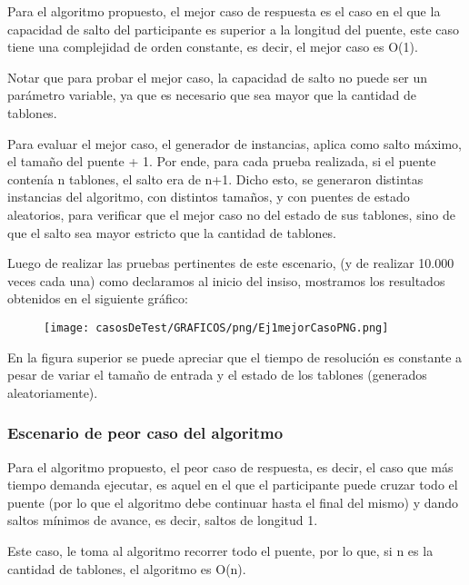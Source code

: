 \noindent Para el algoritmo propuesto, el mejor caso de respuesta es el caso en el que la capacidad de salto del participante es superior a la longitud del puente, este caso tiene una complejidad de orden constante, es decir, el mejor caso es O(1).

\noindent Notar que para probar el mejor caso, la capacidad de salto no puede ser un parámetro variable, ya que es necesario que sea mayor que la cantidad de tablones.

\noindent Para evaluar el mejor caso, el generador de instancias, aplica como salto máximo, el tamaño del puente + 1. Por ende, para cada prueba realizada, si el puente contenía n tablones, el salto era de n+1.
Dicho esto, se generaron distintas instancias del algoritmo, con distintos tamaños, y con puentes de estado aleatorios, para verificar que el mejor caso no del estado de sus tablones, sino de que el salto sea mayor estricto que la cantidad de tablones.

\noindent Luego de realizar las pruebas pertinentes de este escenario, (y de realizar  10.000 veces cada una) como declaramos al inicio del insiso, mostramos los resultados obtenidos en el siguiente gráfico:

	\begin{figure}[h]
		\begin{center}
		   \texttt{[image: casosDeTest/GRAFICOS/png/Ej1mejorCasoPNG.png]}
		\end{center}
	\end{figure}

\indent En la figura superior se puede apreciar que el tiempo de resolución es constante a pesar de variar el tamaño de entrada y el estado de los tablones (generados aleatoriamente).\\

\subsubsection{Escenario de peor caso del algoritmo}

\noindent Para el algoritmo propuesto, el peor caso de respuesta, es decir, el caso que más tiempo demanda ejecutar,  es aquel en el que el participante puede cruzar todo el puente (por lo que el algoritmo debe continuar hasta el final del mismo) y dando saltos mínimos de avance, es decir, saltos de longitud 1.

\noindent Este caso, le toma al algoritmo recorrer todo el puente, por lo que, si n es la cantidad de tablones, el algoritmo es O(n).

